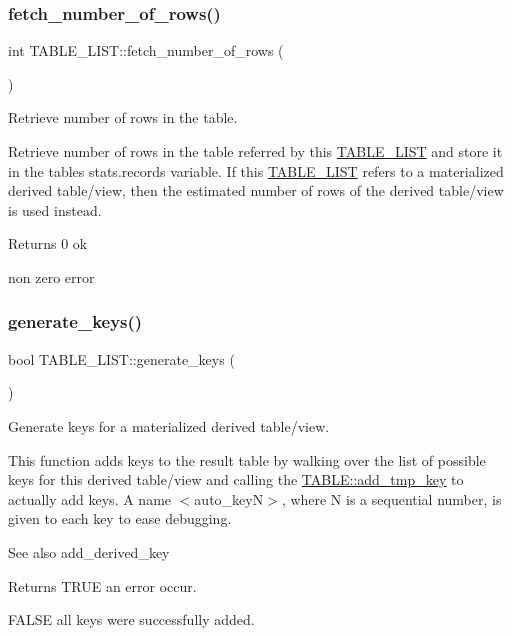 \subsubsection{\texorpdfstring{fetch\+\_\+number\+\_\+of\+\_\+rows()}{fetch\_number\_of\_rows()}}
{\footnotesize\ttfamily int T\+A\+B\+L\+E\+\_\+\+L\+I\+S\+T\+::fetch\+\_\+number\+\_\+of\+\_\+rows (\begin{DoxyParamCaption}{ }\end{DoxyParamCaption})}



Retrieve number of rows in the table. 

Retrieve number of rows in the table referred by this \mbox{\hyperlink{structTABLE__LIST}{T\+A\+B\+L\+E\+\_\+\+L\+I\+ST}} and store it in the table\textquotesingle{}s stats.\+records variable. If this \mbox{\hyperlink{structTABLE__LIST}{T\+A\+B\+L\+E\+\_\+\+L\+I\+ST}} refers to a materialized derived table/view, then the estimated number of rows of the derived table/view is used instead.

\begin{DoxyReturn}{Returns}
0 ok 

non zero error 
\end{DoxyReturn}
\mbox{\label{structTABLE__LIST_a6997748d74d5802c625d2db9f423ba58}} 
\subsubsection{\texorpdfstring{generate\+\_\+keys()}{generate\_keys()}}
{\footnotesize\ttfamily bool T\+A\+B\+L\+E\+\_\+\+L\+I\+S\+T\+::generate\+\_\+keys (\begin{DoxyParamCaption}{ }\end{DoxyParamCaption})}



Generate keys for a materialized derived table/view. 

This function adds keys to the result table by walking over the list of possible keys for this derived table/view and calling the \mbox{\hyperlink{structTABLE_ad78429d129e0432b21bfdb41c05f928a}{T\+A\+B\+L\+E\+::add\+\_\+tmp\+\_\+key}} to actually add keys. A name $<$auto\+\_\+key\+N$>$, where N is a sequential number, is given to each key to ease debugging. \begin{DoxySeeAlso}{See also}
add\+\_\+derived\+\_\+key
\end{DoxySeeAlso}
\begin{DoxyReturn}{Returns}
T\+R\+UE an error occur. 

F\+A\+L\+SE all keys were successfully added. 
\end{DoxyReturn}
\mbox{\label{structTABLE__LIST_aa568c48d88f1aa6bfec97f3d3244b895}} 
